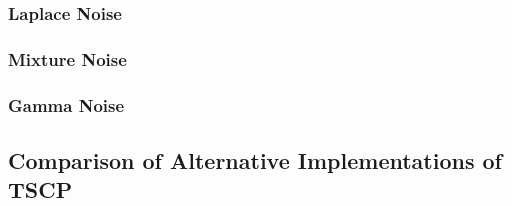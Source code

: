 \clearpage
\subsubsection*{Laplace Noise}
\begin{table}[H]
    \centering
    
    \caption{Performance of the proposed TSCP method and alternative conformal prediction approaches on simulated data with $d=10$ outcome variables, and noise following a \emph{Laplace} distribution; i.e., $\epsilon _j \sim \mathrm{Laplace}(10-j+1)$ for all $j \in [10]$. Other details are as in Table~\ref{tab:gaussian-heter}.}
    \label{tab:laplace}
\end{table}

\clearpage
\subsubsection*{Mixture Noise}

\begin{table}[H]
    \centering
    
    \caption{Performance of the proposed TSCP method and alternative conformal prediction approaches on simulated data with $d=10$ outcome variables, and noise following a \emph{Mixture} distribution; i.e., $\epsilon_j \sim \frac{1}{2}\mathrm{Laplace}(10-j+1)+\frac{1}{2}\mathcal{N}(0, (10-j+1)^2)$ for all $j \in [10]$. Other details are as in Table~\ref{tab:gaussian-heter}.}
    \label{tab:mixed}
\end{table}

\clearpage
\subsubsection*{Gamma Noise}
 
\begin{table}[H]
    \centering
    
    \caption{Performance of the proposed TSCP method and alternative conformal prediction approaches on simulated data with $d=10$ outcome variables, and noise following a \emph{Gamma} distribution; i.e., $\epsilon_j \sim  \mathrm{Gamma}(1, 10-j+1)$ for all $j \in [10]$. Other details are as in Table~\ref{tab:gaussian-heter}.}
    \label{tab:gamma}
  \end{table}

\clearpage
  \subsection{Comparison of Alternative Implementations of TSCP}
\label{app:ours_simulation}

